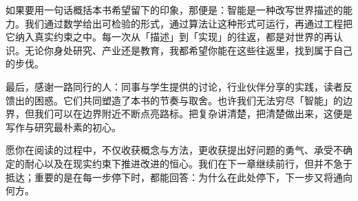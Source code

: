 如果要用一句话概括本书希望留下的印象，那便是：智能是一种改写世界描述的能力。我们通过数学给出可检验的形式，通过算法让这种形式可运行，再通过工程把它纳入真实约束之中。每一次从「描述」到「实现」的往返，都是对世界的再认识。无论你身处研究、产业还是教育，我都希望你能在这些往返里，找到属于自己的步伐。

最后，感谢一路同行的人：同事与学生提供的讨论，行业伙伴分享的实践，读者反馈出的困惑。它们共同塑造了本书的节奏与取舍。也许我们无法穷尽「智能」的边界，但我们可以在边界附近不断点亮路标。把复杂讲清楚，把清楚做出来，这便是写作与研究最朴素的初心。

愿你在阅读的过程中，不仅收获概念与方法，更收获提出好问题的勇气、承受不确定的耐心以及在现实约束下推进改进的恒心。我们在下一章继续前行，但并不急于抵达；重要的是在每一步停下时，都能回答：为什么在此处停下，下一步又将通向何方。